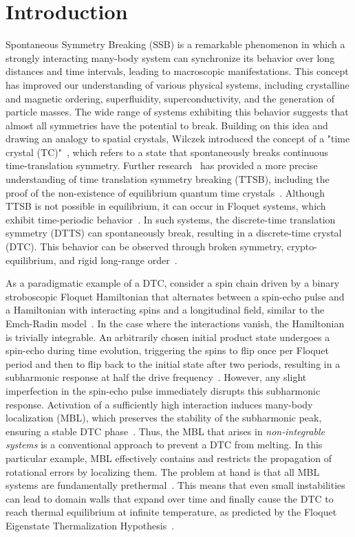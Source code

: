 \documentclass[preprint,5p,times,twocolumn]{elsarticle}
\begin{document}
\section{Introduction}
\label{introduction}
Spontaneous Symmetry Breaking (SSB) is a remarkable phenomenon in which a strongly interacting many-body system can synchronize its behavior over long distances and time intervals, leading to macroscopic manifestations. This concept has improved our understanding of various physical systems, including crystalline and magnetic ordering, superfluidity, superconductivity, and the generation of particle masses. The wide range of systems exhibiting this behavior suggests that almost all symmetries have the potential to break. Building on this idea and drawing an analogy to spatial crystals, Wilczek introduced the concept of a "time crystal (TC)"~\citep{PhysRevLett.109.160401}, which refers to a state that spontaneously breaks continuous time-translation symmetry. Further research~\citep{PhysRevA.91.033617,PhysRevLett.116.250401,PhysRevLett.118.030401} has provided a more precise understanding of time translation symmetry breaking (TTSB), including the proof of the non-existence of equilibrium quantum time crystals~\citep{PhysRevLett.111.070402,PhysRevLett.114.251603}. Although TTSB is not possible in equilibrium, it can occur in Floquet systems, which exhibit time-periodic behavior~\citep{PhysRevLett.117.090402}. In such systems, the discrete-time translation symmetry (DTTS) can spontaneously break, resulting in a discrete-time crystal (DTC). This behavior can be observed through broken symmetry, crypto-equilibrium, and rigid long-range order~\citep{10.1063/PT.3.4020}.

As a paradigmatic example of a DTC, consider a spin chain driven by a binary stroboscopic Floquet Hamiltonian that alternates between a spin-echo pulse and a Hamiltonian with interacting spins and a longitudinal field, similar to the Emch-Radin model~\citep{ermodel:emch, ermodel:radin}. In the case where the interactions vanish, the Hamiltonian is trivially integrable. An arbitrarily chosen initial product state undergoes a spin-echo during time evolution, triggering the spins to flip once per Floquet period and then to flip back to the initial state after two periods, resulting in a subharmonic response at half the drive frequency~\citep{PhysRevLett.118.030401}. However, any slight imperfection in the spin-echo pulse immediately disrupts this subharmonic response. Activation of a sufficiently high interaction induces many-body localization (MBL), which preserves the stability of the subharmonic peak, ensuring a stable DTC phase~\citep{PhysRevB.94.085112}.
Thus, the MBL that arises in \emph{non-integrable systems} is a conventional approach to prevent a DTC from melting. In this particular example, MBL effectively contains and restricts the propagation of rotational errors by localizing them. The problem at hand is that all MBL systems are fundamentally prethermal~\citep{huse.mbl,PhysRevResearch.1.033202,PhysRevX.7.011026}. This means that even small instabilities can lead to domain walls that expand over time and finally cause the DTC to reach thermal equilibrium at infinite temperature, as predicted by the Floquet Eigenstate Thermalization Hypothesis~\citep{Mori_2018}.
\end{document}
